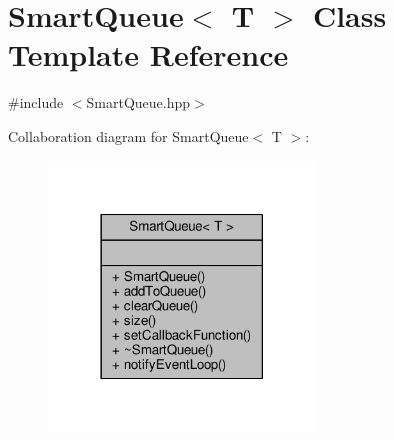 \hypertarget{class_smart_queue}{}\section{Smart\+Queue$<$ T $>$ Class Template Reference}
\label{class_smart_queue}


{\ttfamily \#include $<$Smart\+Queue.\+hpp$>$}



Collaboration diagram for Smart\+Queue$<$ T $>$\+:
\nopagebreak
\begin{figure}[H]
\begin{center}
\leavevmode
\includegraphics[width=201pt]{class_smart_queue__coll__graph}
\end{center}
\end{figure}

